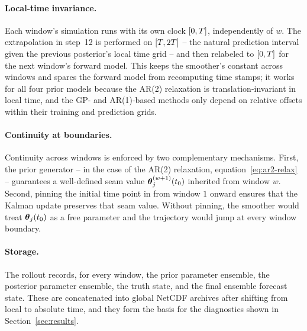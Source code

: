 \paragraph{Local-time invariance.}
Each window's simulation runs with its own clock $[0, T]$,
independently of $w$.  The extrapolation in step~12 is performed on
$[T, 2T]$ -- the natural prediction interval given
the previous posterior's local time grid -- and then relabeled to
$[0, T]$ for the next window's forward model.  This keeps
the smoother's  constant across windows and
spares the forward model from recomputing time stamps; it works for
all four prior models because the AR(2) relaxation is
translation-invariant in local time, and the GP- and AR(1)-based
methods only depend on relative offsets within their training and
prediction grids.

\paragraph{Continuity at boundaries.}
Continuity across windows is enforced by two complementary
mechanisms.  First, the prior generator -- in the case of the AR(2)
relaxation, equation~\eqref{eq:ar2-relax} -- guarantees a well-defined
seam value $\boldsymbol{\theta}_j^{(w+1)}(t_0)$ inherited from window $w$.
Second, pinning the initial time point in \ESMDA{} from window $1$
onward ensures that the Kalman update preserves that seam value.
Without pinning, the smoother would treat $\boldsymbol{\theta}_j(t_0)$ as a free
parameter and the trajectory would jump at every window boundary.

\paragraph{Storage.}
The rollout records, for every window, the prior parameter ensemble,
the posterior parameter ensemble, the truth state, and the final
ensemble forecast state.  These are concatenated into global NetCDF
archives after shifting from local to absolute time, and they form
the basis for the diagnostics shown in
Section~\ref{sec:results}.
